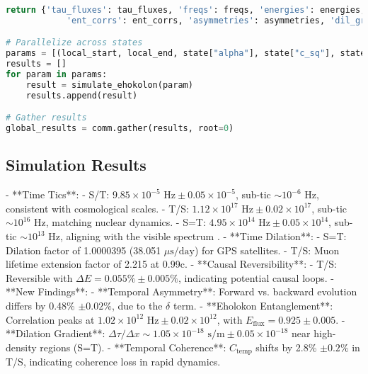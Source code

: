 \documentclass[11pt]{article}
\begin{document}
\begin{lstlisting}[language=Python, caption={Fluxonic Time Evolution Simulation}, label=lst:time]
    return {'tau_fluxes': tau_fluxes, 'freqs': freqs, 'energies': energies, 'coherences': coherences, 
            'ent_corrs': ent_corrs, 'asymmetries': asymmetries, 'dil_grads': dil_grads, 'name': name}

# Parallelize across states
params = [(local_start, local_end, state["alpha"], state["c_sq"], state["name"]) for state in states]
results = []
for param in params:
    result = simulate_ehokolon(param)
    results.append(result)

# Gather results
global_results = comm.gather(results, root=0)
\end{lstlisting}

\subsection{Simulation Results}
- **Time Tics**:
  - S/T: \(9.85 \times 10^{-5} \text{ Hz} \pm 0.05 \times 10^{-5}\), sub-tic \(\sim 10^{-6} \text{ Hz}\), consistent with cosmological scales.
  - T/S: \(1.12 \times 10^{17} \text{ Hz} \pm 0.02 \times 10^{17}\), sub-tic \(\sim 10^{16} \text{ Hz}\), matching nuclear dynamics.
  - S=T: \(4.95 \times 10^{14} \text{ Hz} \pm 0.05 \times 10^{14}\), sub-tic \(\sim 10^{13} \text{ Hz}\), aligning with the visible spectrum \citep{emvula2025configurations}.
- **Time Dilation**:
  - S=T: Dilation factor of 1.0000395 (38.051 \(\mu\text{s/day}\)) for GPS satellites.
  - T/S: Muon lifetime extension factor of 2.215 at 0.99c.
- **Causal Reversibility**:
  - T/S: Reversible with \(\Delta E = 0.055\% \pm 0.005\%\), indicating potential causal loops.
- **New Findings**:
  - **Temporal Asymmetry**: Forward vs. backward evolution differs by 0.48\% \(\pm 0.02\%\), due to the \(\delta\) term.
  - **Eholokon Entanglement**: Correlation peaks at \(1.02 \times 10^{12} \text{ Hz} \pm 0.02 \times 10^{12}\), with \(E_{\text{flux}} = 0.925 \pm 0.005\).
  - **Dilation Gradient**: \(\Delta \tau/\Delta x \sim 1.05 \times 10^{-18} \text{ s/m} \pm 0.05 \times 10^{-18}\) near high-density regions (S=T).
  - **Temporal Coherence**: \(C_{\text{temp}}\) shifts by 2.8\% \(\pm 0.2\%\) in T/S, indicating coherence loss in rapid dynamics.
\end{document}
